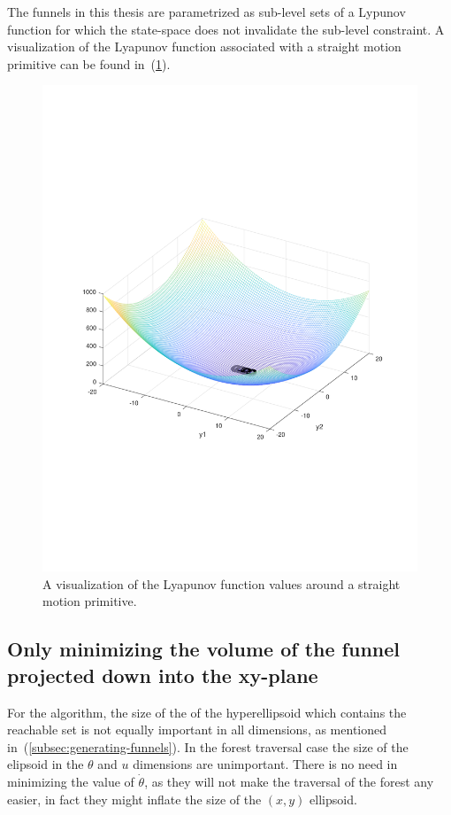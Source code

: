 The funnels in this thesis are parametrized as sub-level sets of a Lypunov
function for which the state-space does not invalidate the sub-level constraint.
A visualization of the Lyapunov function associated with a straight motion
primitive can be found in~(\ref{fig:visualized-lyapunov}).
\begin{figure}
  \centering
  \includegraphics[scale=.3]{figures/rrtfunnel/straight-funnel-lyapunov-3d}
  \caption{A visualization of the Lyapunov function values around a straight
    motion primitive.}
  \label{fig:visualized-lyapunov}
\end{figure}

\subsection{Only minimizing the volume of the funnel projected down into the
  xy-plane}
\label{subsec:xy-cost-function}

For the \rrtfunnel{} algorithm, the size of the of the hyperellipsoid which
contains the reachable set is not equally important in all dimensions, as
mentioned in~(\ref{subsec:generating-funnels}). In the forest traversal case the
size of the elipsoid in the \(\theta\) and \(u\) dimensions are unimportant.
There is no need in minimizing the value of \(\dot{\theta}\), as they will not
make the traversal of the forest any easier, in fact they might inflate the size
of the \((x,y)\) ellipsoid.

